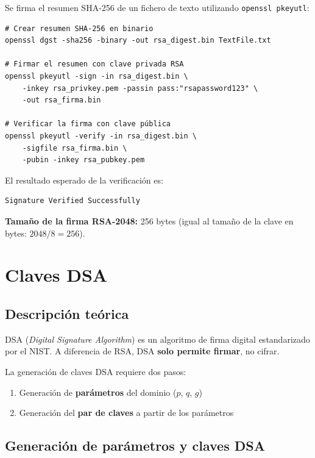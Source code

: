 Se firma el resumen SHA-256 de un fichero de texto utilizando \texttt{openssl pkeyutl}:

\begin{lstlisting}[caption=Firma y verificación RSA con SHA-256]
# Crear resumen SHA-256 en binario
openssl dgst -sha256 -binary -out rsa_digest.bin TextFile.txt

# Firmar el resumen con clave privada RSA
openssl pkeyutl -sign -in rsa_digest.bin \
    -inkey rsa_privkey.pem -passin pass:"rsapassword123" \
    -out rsa_firma.bin

# Verificar la firma con clave pública
openssl pkeyutl -verify -in rsa_digest.bin \
    -sigfile rsa_firma.bin \
    -pubin -inkey rsa_pubkey.pem
\end{lstlisting}

El resultado esperado de la verificación es:

\begin{lstlisting}[caption=Resultado de verificación]
Signature Verified Successfully
\end{lstlisting}

\textbf{Tamaño de la firma RSA-2048:} 256 bytes (igual al tamaño de la clave en bytes: $2048 / 8 = 256$).


\section{Claves DSA}

\subsection{Descripción teórica}

DSA (\textit{Digital Signature Algorithm}) es un algoritmo de firma digital estandarizado por el NIST. A diferencia de RSA, DSA \textbf{solo permite firmar}, no cifrar.

La generación de claves DSA requiere dos pasos:
\begin{enumerate}
    \item Generación de \textbf{parámetros} del dominio ($p$, $q$, $g$)
    \item Generación del \textbf{par de claves} a partir de los parámetros
\end{enumerate}

\subsection{Generación de parámetros y claves DSA}

